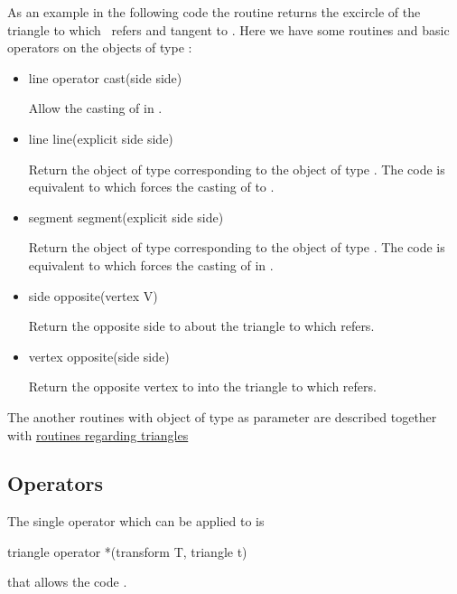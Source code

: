 \documentclass[pdftex]{article}
\begin{document}
As an example in the following code the routine
\hypertarget{excircleside}{} returns the excircle of the
triangle to which~ refers and tangent to .
Here we have some routines and basic operators on the objects of type :
\begin{itemize}
\item {}
  \begin{Vcolor}
    line operator cast(side side)
  \end{Vcolor}
  Allow the casting of  in .
\item {}
  \begin{Vcolor}
    line line(explicit side side)
  \end{Vcolor}
  Return the object of type  corresponding to the
  object  of type . The code  is
  equivalent to  which forces the casting of 
  to .
\item {}
  \begin{Vcolor}
    segment segment(explicit side side)
  \end{Vcolor}
  Return the object of type   corresponding to the
  object  of type . The code  is
  equivalent to  which forces the casting of
   in .
\item {}
  \begin{Vcolor}
    side opposite(vertex V)
  \end{Vcolor}
  Return the opposite side to  about the triangle to
  which  refers.
\item {}
  \begin{Vcolor}
    vertex opposite(side side)
  \end{Vcolor}
  Return the opposite vertex to  into the triangle to
  which  refers.
\end{itemize}
The another routines with object of type  as parameter are
described together with \href{#subsection.routines}{routines regarding triangles}

\subsection{Operators}
The single operator which can be applied to  is
\begin{Vcolor}
  triangle operator *(transform T, triangle t)
\end{Vcolor}
\noindent that allows the code  .
\end{document}
